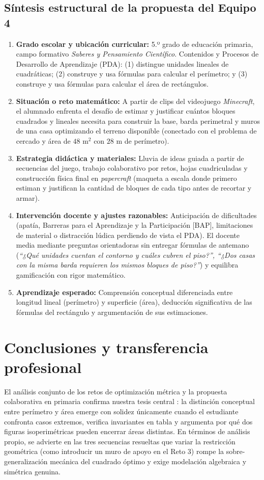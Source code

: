 \documentclass[spanish,letterpaper,oneside]{article}
\begin{document}
\subsection{Síntesis estructural de la propuesta del Equipo 4}
\begin{enumerate}
  \item \textbf{Grado escolar y ubicación curricular:} 5.º grado de educación primaria, campo formativo \textit{Saberes y Pensamiento Científico}. Contenidos y Procesos de Desarrollo de Aprendizaje (PDA): (1) distingue unidades lineales de cuadráticas; (2) construye y usa fórmulas para calcular el perímetro; y (3) construye y usa fórmulas para calcular el área de rectángulos.
  \item \textbf{Situación o reto matemático:} A partir de clips del videojuego \textit{Minecraft}, el alumnado enfrenta el desafío de estimar y justificar cuántos bloques cuadrados y lineales necesita para construir la base, barda perimetral y muros de una casa optimizando el terreno disponible (conectado con el problema de cercado y área de $48\text{ m}^2$ con $28\text{ m}$ de perímetro).
  \item \textbf{Estrategia didáctica y materiales:} Lluvia de ideas guiada a partir de secuencias del juego, trabajo colaborativo por retos, hojas cuadriculadas y construcción física final en \textit{papercraft} (maqueta a escala donde primero estiman y justifican la cantidad de bloques de cada tipo antes de recortar y armar).
  \item \textbf{Intervención docente y ajustes razonables:} Anticipación de dificultades (apatía, Barreras para el Aprendizaje y la Participación [BAP], limitaciones de material o distracción lúdica perdiendo de vista el PDA). El docente media mediante preguntas orientadoras sin entregar fórmulas de antemano (\textit{``¿Qué unidades cuentan el contorno y cuáles cubren el piso?'', ``¿Dos casas con la misma barda requieren los mismos bloques de piso?''}) y equilibra gamificación con rigor matemático.
  \item \textbf{Aprendizaje esperado:} Comprensión conceptual diferenciada entre longitud lineal (perímetro) y superficie (área), deducción significativa de las fórmulas del rectángulo y argumentación de sus estimaciones.
\end{enumerate}

\clearpage
\section{Conclusiones y transferencia profesional}
El análisis conjunto de los retos de optimización métrica y la propuesta colaborativa en primaria confirma nuestra tesis central \citep{iiiepe2026_s8,brousseau1997}: la distinción conceptual entre perímetro y área emerge con solidez únicamente cuando el estudiante confronta casos extremos, verifica invariantes en tabla y argumenta por qué dos figuras isoperimétricas pueden encerrar áreas distintas. En términos de análisis propio, se advierte en las tres secuencias resueltas que variar la restricción geométrica (como introducir un muro de apoyo en el Reto 3) rompe la sobre-generalización mecánica del cuadrado óptimo y exige modelación algebraica y simétrica genuina.
\end{document}

